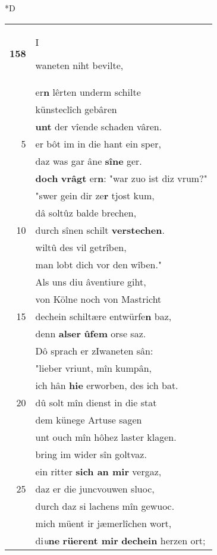 \documentclass[8pt,a4paper,notitlepage]{article}
\begin{document}
\begin{table}[ht]
\begin{minipage}[t]{0.5\linewidth}
\small
\begin{center}*D
\end{center}
\begin{tabular}{rl}
\textbf{158} & \begin{large}I\end{large}waneten niht bevilte,\\ 
 & er\textbf{n} lêrten underm schilte\\ 
 & künsteclîch gebâren\\ 
 & \textbf{unt} der vîende schaden vâren.\\ 
5 & er bôt im in die hant ein sper,\\ 
 & daz was gar âne \textbf{sîne} ger.\\ 
 & \textbf{doch} \textbf{vrâgt} er\textbf{n}: "war zuo ist diz vrum?"\\ 
 & "swer gein dir ze\textbf{r} tjost kum,\\ 
 & dâ soltûz balde brechen,\\ 
10 & durch sînen schilt \textbf{verstechen}.\\ 
 & wiltû des vil getrîben,\\ 
 & man lobt dich vor den wîben."\\ 
 & Als uns diu âventiure giht,\\ 
 & von Kölne noch von Mastricht\\ 
15 & dechein schiltære entwürfe\textbf{n} baz,\\ 
 & denn \textbf{alser} \textbf{ûfem} orse saz.\\ 
 & Dô sprach er zIwaneten sân:\\ 
 & "lieber vriunt, mîn kumpân,\\ 
 & ich hân \textbf{hie} erworben, des ich bat.\\ 
20 & dû solt mîn dienst in die stat\\ 
 & dem künege Artuse sagen\\ 
 & unt ouch mîn hôhez laster klagen.\\ 
 & bring im wider sîn goltvaz.\\ 
 & ein ritter \textbf{sich an mir} vergaz,\\ 
25 & daz er die juncvouwen sluoc,\\ 
 & durch daz si lachens mîn gewuoc.\\ 
 & mich müent ir jæmerlîchen wort,\\ 
 & di\textit{u}\textbf{ne} \textbf{rüerent mir} \textbf{dechein} herzen ort;\\ 

\end{tabular}
\end{minipage}
\end{table}
\end{document}
